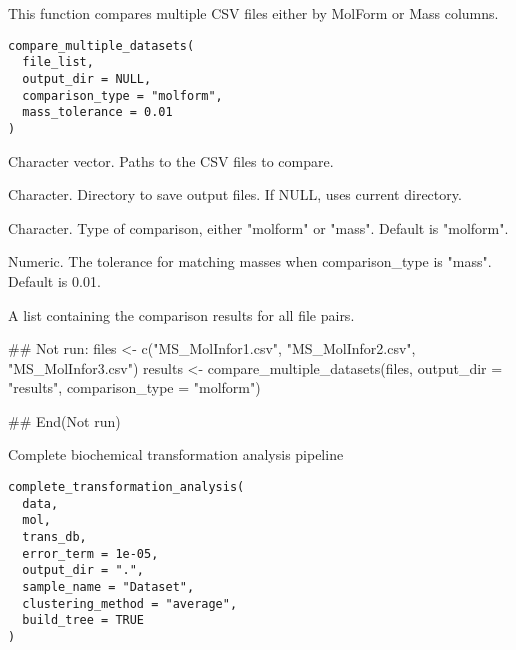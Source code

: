 \documentclass[a4paper]{book}
\begin{document}
%
\begin{Description}
This function compares multiple CSV files either by MolForm or Mass columns.
\end{Description}
%
\begin{Usage}
\begin{verbatim}
compare_multiple_datasets(
  file_list,
  output_dir = NULL,
  comparison_type = "molform",
  mass_tolerance = 0.01
)
\end{verbatim}
\end{Usage}
%
\begin{Arguments}
\begin{ldescription}
\item[\code{file\_list}] Character vector. Paths to the CSV files to compare.

\item[\code{output\_dir}] Character. Directory to save output files. If NULL, uses current directory.

\item[\code{comparison\_type}] Character. Type of comparison, either "molform" or "mass". Default is "molform".

\item[\code{mass\_tolerance}] Numeric. The tolerance for matching masses when comparison\_type is "mass". Default is 0.01.
\end{ldescription}
\end{Arguments}
%
\begin{Value}
A list containing the comparison results for all file pairs.
\end{Value}
%
\begin{Examples}
\begin{ExampleCode}
## Not run: 
files <- c("MS_MolInfor1.csv", "MS_MolInfor2.csv", "MS_MolInfor3.csv")
results <- compare_multiple_datasets(files, output_dir = "results", comparison_type = "molform")

## End(Not run)
\end{ExampleCode}
\end{Examples}
%
\begin{Description}
Complete biochemical transformation analysis pipeline
\end{Description}
%
\begin{Usage}
\begin{verbatim}
complete_transformation_analysis(
  data,
  mol,
  trans_db,
  error_term = 1e-05,
  output_dir = ".",
  sample_name = "Dataset",
  clustering_method = "average",
  build_tree = TRUE
)
\end{verbatim}
\end{Usage}
\end{document}
